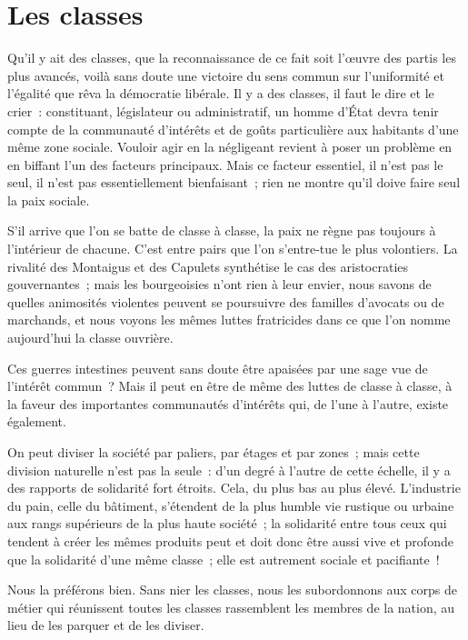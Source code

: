 \documentclass[french,twoside]{book} %
\begin{document}
\section[{Les classes}]{Les classes}
\noindent Qu’il y ait des classes, que la reconnaissance de ce fait soit l’œuvre des partis les plus avancés, voilà sans doute une victoire du sens commun sur l’uniformité et l’égalité que rêva la démocratie libérale. Il y a des classes, il faut le dire et le crier : constituant, législateur ou administratif, un homme d’État devra tenir compte de la communauté d’intérêts et de goûts particulière aux habitants d’une même zone sociale. Vouloir agir en la négligeant revient à poser un problème en en biffant l’un des facteurs principaux. Mais ce facteur essentiel, il n’est pas le seul, il n’est pas essentiellement bienfaisant ; rien ne montre qu’il doive faire seul la paix sociale.\par
S’il arrive que l’on se batte de classe à classe, la paix ne règne pas toujours à l’intérieur de chacune. C’est entre pairs que l’on s’entre-tue le plus volontiers. La rivalité des Montaigus et des Capulets synthétise le cas des aristocraties gouvernantes ; mais les bourgeoisies n’ont rien à leur envier, nous savons de quelles animosités violentes peuvent se poursuivre des familles d’avocats ou de marchands, et nous voyons les mêmes luttes fratricides dans ce que l’on nomme aujourd’hui la classe ouvrière.\par
Ces guerres intestines peuvent sans doute être apaisées par une sage vue de l’intérêt commun ? Mais il peut en être de même des luttes de classe à classe, à la faveur des importantes communautés d’intérêts qui, de l’une à l’autre, existe également.\par
On peut diviser la société par paliers, par étages et par zones ; mais cette division naturelle n’est pas la seule : d’un degré à l’autre de cette échelle, il y a des rapports de solidarité fort étroits. Cela, du plus bas au plus élevé. L’industrie du pain, celle du bâtiment, s’étendent de la plus humble vie rustique ou urbaine aux rangs supérieurs de la plus haute société ; la solidarité entre tous ceux qui tendent à créer les mêmes produits peut et doit donc être aussi vive et profonde que la solidarité d’une même classe ; elle est autrement sociale et pacifiante !\par
Nous la préférons bien. Sans nier les classes, nous les subordonnons aux corps de métier qui réunissent toutes les classes rassemblent les membres de la nation, au lieu de les parquer et de les diviser.\par
\end{document}
